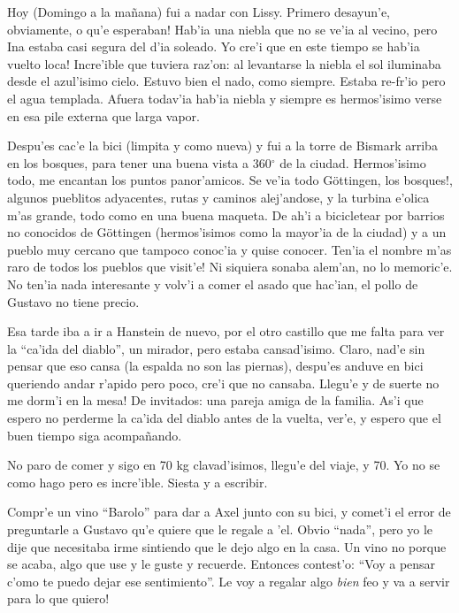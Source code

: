 Hoy (Domingo a la ma\~nana) fui a nadar con Lissy. \textexclamdown Primero
desayun'e, obviamente, o qu'e esperaban! Hab'ia una niebla que no se ve'ia al
vecino, pero Ina estaba casi segura del d'ia soleado. \textexclamdown Yo cre'i
que en este tiempo se hab'ia vuelto loca! Incre'ible que tuviera raz'on: al
levantarse la niebla el sol iluminaba desde el azul'isimo cielo. Estuvo bien el
nado, como siempre. Estaba re-fr'io pero el agua templada. Afuera todav'ia
hab'ia niebla y siempre es hermos'isimo verse en esa pile externa que larga
vapor.

Despu'es cac'e la bici (limpita y como nueva) y fui a la torre de Bismark
arriba en los bosques, para tener una buena vista a 360$^\circ$ de la ciudad.
Hermos'isimo todo, me encantan los puntos panor'amicos. Se ve'ia todo
G\"ottingen, \textexclamdown los bosques!, algunos pueblitos adyacentes, rutas y
caminos alej'andose, y la turbina e'olica m'as grande, todo como en una buena
maqueta. De ah'i a bicicletear por barrios no conocidos de G\"ottingen
(hermos'isimos como la mayor'ia de la ciudad) y a un pueblo muy cercano que
tampoco conoc'ia y quise conocer. \textexclamdown Ten'ia el nombre m'as raro de
todos los pueblos que visit'e! Ni siquiera sonaba alem'an, no lo memoric'e. No
ten'ia nada interesante y volv'i a comer el asado que hac'ian, el pollo de
Gustavo no tiene precio.

Esa tarde iba a ir a Hanstein de nuevo, por el otro castillo que me falta para
ver la ``ca'ida del diablo'', un mirador, pero estaba cansad'isimo. Claro, nad'e
sin pensar que eso cansa (la espalda no son las piernas), despu'es anduve en
bici queriendo andar r'apido pero poco, cre'i que no cansaba. \textexclamdown
Llegu'e y de suerte no me dorm'i en la mesa! De invitados: una pareja amiga
de la familia. As'i que espero no perderme la ca'ida del diablo antes de la
vuelta, ver'e, y espero que el buen tiempo siga acompa\~nando.

No paro de comer y sigo en 70 kg clavad'isimos, llegu'e del viaje, y 70. Yo no
se como hago pero es incre'ible. Siesta y a escribir.

Compr'e un vino ``Barolo'' para dar a Axel junto con su bici, y comet'i el error
de preguntarle a Gustavo qu'e quiere que le regale a 'el. Obvio ``nada'', pero
yo le dije que necesitaba irme sintiendo que le dejo algo en la casa. Un vino no
porque se acaba, algo que use y le guste y recuerde. Entonces contest'o: ``Voy a
pensar c'omo te puedo dejar ese sentimiento''. \textexclamdown Le voy a regalar
algo {\sl bien} feo y va a servir para lo que quiero!

